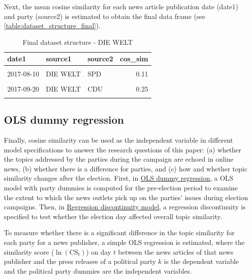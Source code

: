 \documentclass[
  12pt,
]{article}
\begin{document}
Next, the mean cosine similarity for each news article publication date
(date1) and party (source2) is estimated to obtain the final data frame
(see \autoref{table:dataset_structure_final}).

\begin{table}[H]

\caption{\label{tab:Dataset structure final}Final dataset structure - DIE WELT \label{table:dataset_structure_final}}
\centering
\fontsize{7}{9}\selectfont
\begin{tabular}[t]{lllr}
\toprule
date1 & source1 & source2 & cos\_sim\\
\midrule
\cellcolor{gray!6}{2017-07-02} & \cellcolor{gray!6}{DIE WELT} & \cellcolor{gray!6}{DIE LINKE} & \cellcolor{gray!6}{0.06}\\
2017-08-10 & DIE WELT & SPD & 0.11\\
\cellcolor{gray!6}{2017-06-26} & \cellcolor{gray!6}{DIE WELT} & \cellcolor{gray!6}{DIE LINKE} & \cellcolor{gray!6}{0.17}\\
2017-09-20 & DIE WELT & CDU & 0.25\\
\cellcolor{gray!6}{2017-10-24} & \cellcolor{gray!6}{DIE WELT} & \cellcolor{gray!6}{CDU} & \cellcolor{gray!6}{0.12}\\
\bottomrule
\end{tabular}
\end{table}

\hypertarget{ols-dummy-regression}{%
\subsection{OLS dummy regression}\label{ols-dummy-regression}}

Finally, cosine similarity can be used as the independent variable in
different model specifications to answer the research questions of this
paper: (a) whether the topics addressed by the parties during the
campaign are echoed in online news, (b) whether there is a difference
for parties, and (c) how and whether topic similarity changes after the
election. First, in \protect\hyperlink{ols-dummy-regression}{OLS dummy
regression}, a OLS model with party dummies is computed for the
pre-election period to examine the extent to which the news outlets pick
up on the parties' issues during election campaigns. Then, in
\protect\hyperlink{regression-discontinuity-model}{Regression
discontinuity model}, a regression discontinuity is specified to test
whether the election day affected overall topic similarity.

To measure whether there is a significant difference in the topic
similarity for each party for a news publisher, a simple OLS regression
is estimated, where the similarity score (\(\ln(\text{CS}_{t})\)) on day
\(t\) between the news articles of that news publisher and the press
releases of a political party \(k\) is the dependent variable and the
political party dummies are the independent variables.
\end{document}
